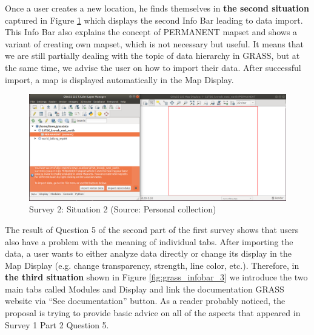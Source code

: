 \documentclass[a4paper,10pt,twoside]{article}
\begin{document}
\noindent Once a user creates a new location, he finds themselves in
\textbf{the second situation} captured in Figure
\ref{fig:grass_infobar_2} which displays the second Info Bar leading
to data import. This Info Bar also explains the concept of PERMANENT
mapset and shows a variant of creating own mapset, which is not
necessary but useful. It means that we are still partially dealing
with the topic of data hierarchy in GRASS, but at the same time, we
advise the user on how to import their data. After successful import,
a map is displayed automatically in the Map Display.

\vspace{0.3cm}
\begin{figure}[hbt!] 
\begin{center}
\includegraphics[width=17cm]{../pictures/grass_infobar_2.png} 
\caption[Survey 2: Situation 2]{Survey 2: Situation 2 (Source: Personal collection)}
\label{fig:grass_infobar_2}
\end{center}
\end{figure}

\noindent The result of Question 5 of the second part of the first
survey shows that users also have a problem with the meaning of
individual tabs. After importing the data, a user wants to either
analyze data directly or change its display in the Map Display
(e.g. change transparency, strength, line color, etc.). Therefore, 
in \textbf{the third situation} shown in Figure \ref{fig:grass_infobar_3} 
we introduce the two main tabs called Modules and Display and
link the documentation GRASS website \cite{manual} via ``See documentation''  
button. As a reader probably noticed, the proposal is trying to provide
basic advice on all of the aspects that appeared in Survey 1 Part 2
Question 5.
\end{document}

